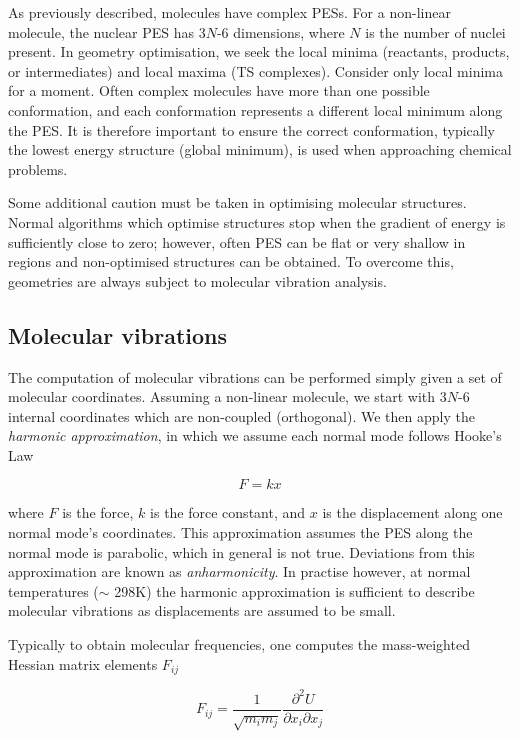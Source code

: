 As previously described, molecules have complex PESs. For a non-linear molecule,
the nuclear PES has 3$N$-6 dimensions, where $N$ is the number of nuclei
present.\cite{Heidrich1991} In geometry optimisation, we seek the local minima
(reactants, products, or intermediates) and local maxima (TS
complexes). Consider only local minima for a moment. Often complex molecules
have more than one possible conformation, and each conformation represents a
different local minimum along the PES. It is therefore important to ensure the
correct conformation, typically the lowest energy structure (global minimum), is
used when approaching chemical problems.

Some additional caution must be taken in optimising molecular structures. Normal
algorithms which optimise structures stop when the gradient of energy is
sufficiently close to zero; however, often PES can be flat or very shallow in
regions and non-optimised structures can be obtained. To overcome this,
geometries are always subject to molecular vibration analysis.

\subsection{Molecular vibrations}

The computation of molecular vibrations can be performed simply given a set of
molecular coordinates.\cite{Wilson1980} Assuming a non-linear molecule, we start
with 3$N$-6 internal coordinates which are non-coupled (orthogonal). We then
apply the \emph{harmonic approximation}, in which we assume each normal mode
follows Hooke's Law

\begin{equation}
  F = kx
\end{equation}


\noindent where $F$ is the force, $k$ is the force constant, and $x$ is the
displacement along one normal mode's coordinates. This approximation assumes the
PES along the normal mode is parabolic, which in general is not true. Deviations
from this approximation are known as \emph{anharmonicity}. In practise however,
at normal temperatures ($\sim$ 298K) the harmonic approximation is sufficient to
describe molecular vibrations as displacements are assumed to be small.

Typically to obtain molecular frequencies, one computes the mass-weighted
Hessian matrix elements $F_{ij}$

\begin{equation}
  F_{ij} = \frac{1}{\sqrt{m_im_j}}\frac{\partial^2U}{\partial x_i\partial x_j}
\end{equation}


